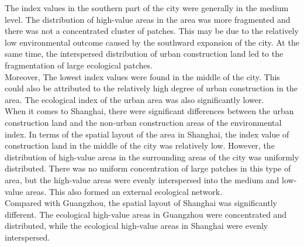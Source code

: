 The index values in the southern part of the city were generally in the medium level. The distribution of high-value areas in the area was more fragmented and there was not a concentrated cluster of patches. This may be due to the relatively low environmental outcome caused by the southward expansion of the city. At the same time, the interspersed distribution of urban construction land led to the fragmentation of large ecological patches.\\

Moreover, The lowest index values were found in the middle of the city. This could also be attributed to the relatively high degree of urban construction in the area. The ecological index of the urban area was also significantly lower.\\

When it comes to Shanghai, there were significant differences between the urban construction land and the non-urban construction areas of the environmental index. In terms of the spatial layout of the area in Shanghai, the index value of construction land in the middle of the city was relatively low. However, the distribution of high-value areas in the surrounding areas of the city was uniformly distributed. There was no uniform concentration of large patches in this type of area, but the high-value areas were evenly interspersed into the medium and low-value areas. This also formed an external ecological network.\\

Compared with Guangzhou, the spatial layout of Shanghai was significantly different. The ecological high-value areas in Guangzhou were concentrated and distributed, while the ecological high-value areas in Shanghai were evenly interspersed.\\


